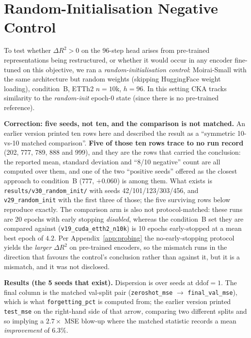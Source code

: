 \section{Random-Initialisation Negative Control}
\label{app:randominit}

To test whether $\Delta R^2{>}0$ on the 96-step head arises from
pre-trained representations being restructured, or whether it would
occur in any encoder fine-tuned on this objective, we ran a
\emph{random-initialisation control}: Moirai-Small with the same
architecture but random weights (skipping HuggingFace weight loading),
condition~B, ETTh2 $n{=}10$k, $h{=}96$.
In this setting CKA tracks similarity to the \emph{random-init}
epoch-0 state (since there is no pre-trained reference).

\textbf{Correction: five seeds, not ten, and the comparison is not matched.}
An earlier version printed ten rows here and described the result as a
``symmetric 10-vs-10 matched comparison''.  \textbf{Five of those ten rows trace
to no run record} (202, 777, 789, 888 and 999), and they are the rows that
carried the conclusion: the reported mean, standard deviation and ``8/10
negative'' count are all computed over them, and one of the two ``positive
seeds'' offered as the closest approach to condition~B (777, $+0.060$) is among
them.  What exists is \texttt{results/v30\_random\_init/} with seeds
42/101/123/303/456, and \texttt{v29\_random\_init} with the first three of those;
the five surviving rows below reproduce exactly.  The comparison arm is also not
protocol-matched: these runs are 20 epochs with early stopping
\emph{disabled}, whereas the condition~B set they are compared against
(\texttt{v19\_cuda\_etth2\_n10k}) is 10 epochs early-stopped at a mean best epoch
of $4.2$.  Per Appendix~\ref{app:probing} the no-early-stopping protocol yields
the \emph{larger} $\Delta R^2$ on pre-trained encoders, so the mismatch runs in
the direction that favours the control's conclusion rather than against it,
but it is a mismatch, and it was not disclosed.

\textbf{Results (the 5 seeds that exist).}  Dispersion is over seeds at
$\text{ddof}{=}1$.  The final column is the matched val-split pair
(\texttt{zeroshot\_mse} $\to$ \texttt{final\_val\_mse}), which is what
\texttt{forgetting\_pct} is computed from; the earlier version printed
\texttt{test\_mse} on the right-hand side of that arrow, comparing two different
splits and so implying a $2.7{\times}$ MSE blow-up where the matched statistic
records a mean \emph{improvement} of $6.3\%$.

